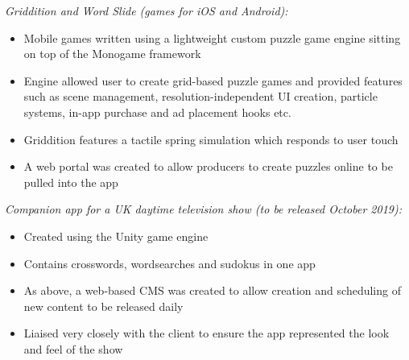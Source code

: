 \item \textit{\emph{Griddition} and \emph{Word Slide} (games for iOS and Android):}
    \begin{itemize}%
        \item Mobile games written using a lightweight custom puzzle game engine sitting on top of the Monogame framework
        \item Engine allowed user to create grid-based puzzle games and provided features such as scene management, resolution-independent UI creation, particle systems, in-app purchase and ad placement hooks etc.
        \item Griddition features a tactile spring simulation which responds to user touch
        \item A web portal was created to allow producers to create puzzles online to be pulled into the app
    \end{itemize}
    \bigbreak
\item \textit{Companion app for a \emph{UK daytime television show} (to be released October 2019):}
    \begin{itemize}
        \item Created using the Unity game engine
        \item Contains crosswords, wordsearches and sudokus in one app
        \item As above, a web-based CMS was created to allow creation and scheduling of new content to be released daily
        \item Liaised very closely with the client to ensure the app represented the look and feel of the show
    \end{itemize}
    \bigbreak
